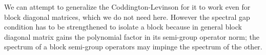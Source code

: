 \documentclass[a4paper,11pt]{article}
\newtheorem{theorem}{Theorem}
\theoremstyle{remark}
\begin{document}
We can attempt to generalize the Coddington-Levinson for it to work even for block diagonal matrices, which we do not need here. However the spectral gap condition has to be strengthened to isolate a block because in general block diagonal matrix gains the polynomial factor in its semi-group operator norm; the spectrum of a block semi-group operators may impinge the spectrum of the other.

%
%
%
\end{document}
